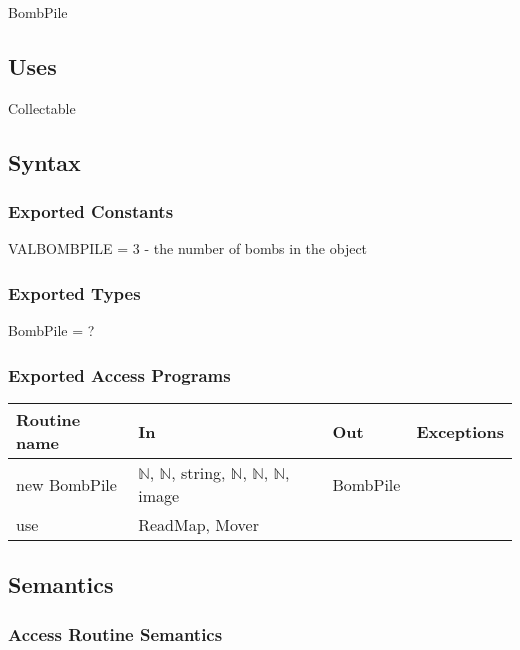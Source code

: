 \documentclass[12pt]{article}
\begin{document}
BombPile

\subsection*{Uses}

Collectable

\subsection*{Syntax}

\subsubsection*{Exported Constants}

VALBOMBPILE = $3$ - the number of bombs in the object

\subsubsection*{Exported Types}

BombPile = ?

\subsubsection*{Exported Access Programs}

\begin{tabular}{| l | l | l | l |}
\hline
\textbf{Routine name} & \textbf{In} & \textbf{Out} & \textbf{Exceptions}\\
\hline
new BombPile & $\mathbb{N}$, $\mathbb{N}$, string, $\mathbb{N}$, $\mathbb{N}$, $\mathbb{N}$, image & BombPile & ~\\
\hline
use & ReadMap, Mover & ~ & ~\\
\hline
\end{tabular}

\subsection*{Semantics}

\subsubsection*{Access Routine Semantics}
\end{document}
